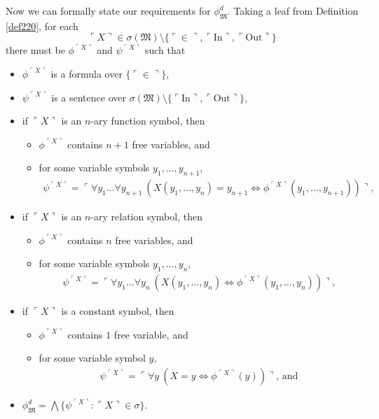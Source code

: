 \documentclass[12pt]{article}
\numberwithin{equation}{section}
\begin{document}
Now we can formally state our requirements for $\phi^d_{\mathfrak{M}}$. Taking a leaf from Definition \ref{def220}, for each 
\begin{equation*}
    \ulcorner X \urcorner \in \sigma(\mathfrak{M}) \setminus \{\ulcorner \in \urcorner, \ulcorner \mathrm{In} \urcorner, \ulcorner \mathrm{Out} \urcorner\}
\end{equation*} there must be $\phi^{\ulcorner X \urcorner}$ and $\psi^{\ulcorner X \urcorner}$ such that
\begin{itemize}
    \item $\phi^{\ulcorner X \urcorner}$ is a formula over $\{\ulcorner \in \urcorner\}$,
    \item $\psi^{\ulcorner X \urcorner}$ is a sentence over $\sigma(\mathfrak{M}) \setminus \{\ulcorner \mathrm{In} \urcorner, \ulcorner \mathrm{Out} \urcorner\}$,
    \item if $\ulcorner X \urcorner$ is an $n$-ary function symbol, then 
    \begin{itemize}[label=$\circ$, leftmargin=20pt]
        \item $\phi^{\ulcorner X \urcorner}$ contains $n + 1$ free variables, and
        \item for some variable symbols $y_1, \dots, y_{n+1}$,
        \begin{align*}
            \psi^{\ulcorner X \urcorner} = \ulcorner \forall y_1 \dots \forall y_{n+1} \ (X(y_1, \dots, y_n) = y_{n+1} \iff \phi^{\ulcorner X \urcorner}(y_1, \dots, y_{n+1})) \urcorner \text{,}
        \end{align*}
    \end{itemize}
    \item if $\ulcorner X \urcorner$ is an $n$-ary relation symbol, then 
    \begin{itemize}[label=$\circ$, leftmargin=20pt]
        \item $\phi^{\ulcorner X \urcorner}$ contains $n$ free variables, and
        \item for some variable symbols $y_1, \dots, y_n$,
        \begin{align*}
            \psi^{\ulcorner X \urcorner} = \ulcorner \forall y_1 \dots \forall y_n \ (X(y_1, \dots, y_n) \iff \phi^{\ulcorner X \urcorner}(y_1, \dots, y_n)) \urcorner \text{,}
        \end{align*}
    \end{itemize}
    \item if $\ulcorner X \urcorner$ is a constant symbol, then 
    \begin{itemize}[label=$\circ$, leftmargin=20pt]
        \item $\phi^{\ulcorner X \urcorner}$ contains $1$ free variable, and
        \item for some variable symbol $y$,
        \begin{align*}
            \psi^{\ulcorner X \urcorner} = \ulcorner \forall y \ (X = y \iff \phi^{\ulcorner X \urcorner}(y)) \urcorner \text{, and}
        \end{align*}
    \end{itemize}
    \item $\phi^d_{\mathfrak{M}} = \bigwedge \{\psi^{\ulcorner X \urcorner} : \ulcorner X \urcorner \in \sigma\}$.
\end{itemize}
\end{document}
